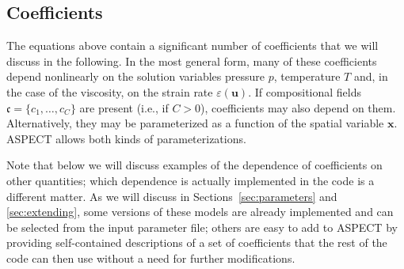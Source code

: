 \documentclass{article}
\newcommand{\aspect}{\textsc{ASPECT}}
\begin{document}
\subsection{Coefficients}
\label{sec:coefficients}

The equations above contain a significant number of coefficients that we will
discuss in the following. In the most general form, many of these coefficients
depend nonlinearly on the solution variables pressure $p$, temperature $T$
and, in the case of the viscosity, on the strain rate $\varepsilon(\mathbf
u)$. If compositional fields $\mathfrak c=\{c_1,\ldots,c_C\}$ are present (i.e.,
if $C>0$), coefficients may also depend on them. Alternatively, they may be
parameterized as a function
of the spatial variable $\mathbf x$. \aspect{} allows both kinds of
parameterizations.

Note that below we will discuss examples of the dependence of coefficients on
other quantities; which dependence is actually implemented in the code is a
different matter. As we will discuss in Sections~\ref{sec:parameters} and
\ref{sec:extending}, some versions of these models are already implemented and
can be selected from the input parameter file; others are easy to add to
\aspect{} by providing self-contained descriptions of a set of coefficients
that the rest of the code can then use without a need for further
modifications.
\end{document}

